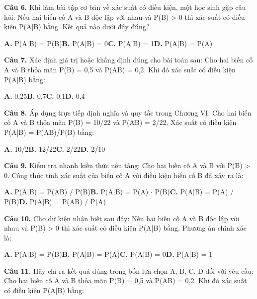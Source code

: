 \documentclass[11pt,a4paper]{article}
\begin{document}
\textbf{\color{primary} Câu 6.} Khi làm bài tập cơ bản về xác suất có điều kiện, một học sinh gặp câu hỏi: Nếu hai biến cố A và B độc lập với nhau và P(B) > 0 thì xác suất có điều kiện P(A|B) bằng. Kết quả nào dưới đây đúng?\par
\hspace*{1.5em}\textbf{A.} P(A|B) = P(B)\quad\quad \textbf{B.} P(A|B) = 0\quad\quad \textbf{C.} P(A|B) = 1\quad\quad \textbf{D.} P(A|B) = P(A)\par\vspace{2pt}
\textbf{\color{primary} Câu 7.} Xác định giá trị hoặc khẳng định đúng cho bài toán sau: Cho hai biến cố A và B thỏa mãn P(B) = 0,5 và P(AB) = 0,2. Khi đó xác suất có điều kiện P(A|B) bằng:\par
\hspace*{1.5em}\textbf{A.} 0,25\quad\quad \textbf{B.} 0,7\quad\quad \textbf{C.} 0,1\quad\quad \textbf{D.} 0,4\par\vspace{2pt}
\textbf{\color{primary} Câu 8.} Áp dụng trực tiếp định nghĩa và quy tắc trong Chương VI: Cho hai biến cố A và B thỏa mãn P(B) = 10/22 và P(AB) = 2/22. Xác suất có điều kiện P(A|B) = P(AB)/P(B) bằng:\par
\hspace*{1.5em}\textbf{A.} 10/2\quad\quad \textbf{B.} 12/22\quad\quad \textbf{C.} 2/22\quad\quad \textbf{D.} 2/10\par\vspace{2pt}
\textbf{\color{primary} Câu 9.} Kiểm tra nhanh kiến thức nền tảng: Cho hai biến cố A và B với P(B) > 0. Công thức tính xác suất của biến cố A với điều kiện biến cố B đã xảy ra là:\par
\hspace*{1.5em}\textbf{A.} P(A|B) = P(AB) / P(B)\quad\quad \textbf{B.} P(A|B) = P(A) $\cdot$ P(B)\quad\quad \textbf{C.} P(A|B) = P(A) / P(B)\quad\quad \textbf{D.} P(A|B) = P(AB) / P(A)\par\vspace{2pt}
\textbf{\color{primary} Câu 10.} Cho dữ kiện nhận biết sau đây: Nếu hai biến cố A và B độc lập với nhau và P(B) > 0 thì xác suất có điều kiện P(A|B) bằng. Phương án chính xác là:\par
\hspace*{1.5em}\textbf{A.} P(A|B) = P(B)\quad\quad \textbf{B.} P(A|B) = P(A)\quad\quad \textbf{C.} P(A|B) = 0\quad\quad \textbf{D.} P(A|B) = 1\par\vspace{2pt}
\textbf{\color{primary} Câu 11.} Hãy chỉ ra kết quả đúng trong bốn lựa chọn A, B, C, D đối với yêu cầu: Cho hai biến cố A và B thỏa mãn P(B) = 0,5 và P(AB) = 0,2. Khi đó xác suất có điều kiện P(A|B) bằng:\par
\end{document}
